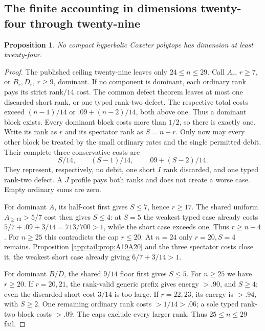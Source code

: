 \documentclass[11pt]{article}
\newtheorem{proposition}[theorem]{Proposition}
\theoremstyle{definition}
\theoremstyle{remark}
\begin{document}
\subsection{The finite accounting in dimensions twenty-four through twenty-nine}
\label{app:tail:24to29}
\begin{proposition}
\label{app:tail:prop:24to29}
No compact hyperbolic Coxeter polytope has dimension at least twenty-four.
\end{proposition}
\begin{proof}
The published ceiling twenty-nine leaves only $24\le n\le29$.
Call $A_r$, $r\ge7$, or $B_r,D_r$, $r\ge9$, dominant.
If no component is dominant, each ordinary rank pays its strict
rank$/14$ cost. The common defect theorem leaves at most one
discarded short rank, or one typed rank-two defect. The respective
total costs exceed $(n-1)/14$ or $.09+(n-2)/14$, both above one.
Thus a dominant block exists. Every dominant block costs more than
$1/2$, so there is exactly one. Write its rank as $r$ and its
spectator rank as $S=n-r$. Only now may every other block be treated
by the small ordinary rates and the single permitted debit.
Their complete three conservative costs are
\[
 S/14,\qquad(S-1)/14,\qquad .09+(S-2)/14.
\]
They represent, respectively, no debit, one short $I$ rank discarded,
and one typed rank-two defect. A $J$ profile pays both ranks and
does not create a worse case. Empty ordinary sums are zero.

For dominant $A$, its half-cost first gives $S\le7$, hence
$r\ge17$. The shared uniform $A_{\ge13}>5/7$ cost then gives
$S\le4$: at $S=5$ the weakest typed case already costs
$5/7+.09+3/14=713/700>1$, while the short case exceeds one.
Thus $r\ge n-4$. For $n\ge25$ this contradicts the cap $r\le20$.
At $n=24$ only $r=20,S=4$ remains. Proposition
\ref{app:tail:prop:A19A20} and the three spectator costs close
it, the weakest short case already giving $6/7+3/14>1$.

For dominant $B/D$, the shared $9/14$ floor first gives $S\le5$.
For $n\ge25$ we have $r\ge20$. If $r=20,21$, the rank-valid
generic prefix gives energy $>.90$, and $S\ge4$; even the
discarded-short cost $3/14$ is too large. If $r=22,23$, its
energy is $>.94$, with $S\ge2$. One remaining ordinary rank
costs $>1/14>.06$; a sole typed rank-two block costs $>.09$.
The caps exclude every larger rank. Thus $25\le n\le29$ fail.


\end{proof}
\end{document}
